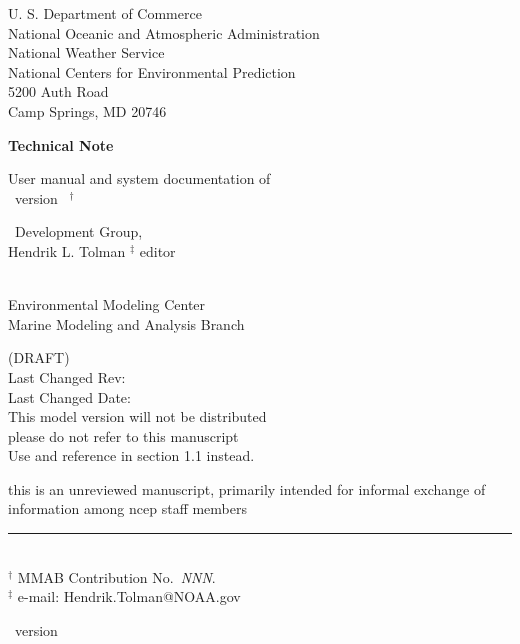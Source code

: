 
\pagestyle{empty}

\begin{center} 
U. S. Department of Commerce \\
National Oceanic and Atmospheric Administration \\
National Weather Service \\
National Centers for Environmental Prediction \\
5200 Auth Road \\
Camp Springs, MD 20746


\vspace{15mm}

{\bf Technical Note}

\vspace{15mm}

{\large User manual and system documentation of \\
\ww\ version \WWver\ $^\dag$} \\

\vspace{15mm}

\ww\ Development Group, \\
Hendrik L. Tolman $^\ddag$ editor\\
\strut \\
Environmental Modeling Center \\
Marine Modeling and Analysis Branch

\vfill

(DRAFT) \\
Last Changed Rev: \SVNRevision \\
Last Changed Date: \SVNDate \\
\vspace{\baselineskip}
This model version will not be distributed \\
{\sc please do not refer to this manuscript} \\
Use \cite{tol:MMAB09a} and reference in section 1.1 instead.


\vfill
{\sc this is an unreviewed manuscript, primarily intended for informal
exchange of information among ncep staff members}

\end{center}
\noindent \rule{140mm}{0.5mm} \\
{\small $^\dag$ MMAB Contribution No.~{\it NNN}. \\
$^\ddag$ e-mail: Hendrik.Tolman@NOAA.gov}

\bpage

\pb

         { \hspace{20.5mm} \ws\ version \WWver}
\pagestyle{myheadings}
\setcounter{page}{1}
\tableofcontents



\pb
\pagestyle{myheadings}

